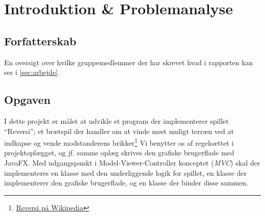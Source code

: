 \section{Introduktion \& Problemanalyse}
\subsection{Forfatterskab}
En oversigt over hvilke gruppemedlemmer der har skrevet hvad i rapporten kan ses i \cref{sec:arbejde}.
\subsection{Opgaven}\label{OP}
I dette projekt er målet at udvikle et program der implementerer spillet ``Reversi''; et brætspil der handler om at vinde mest muligt terræn ved at indkapse og vende modstanderens brikker\footnote{\href{https://www.wikiwand.com/en/Reversi}{Reversi på Wikipedia}} Vi benytter os af regelsættet i projektoplægget, og jf. samme oplæg skrives den grafiske brugerflade med JavaFX.\newline
Med udgangspunkt i Model-Viewer-Controller konceptet (\emph{MVC}) skal der implementeres en klasse med den underliggende logik for spillet, en klasse der implementerer den grafiske brugerflade, og en klasse der binder disse sammen.
